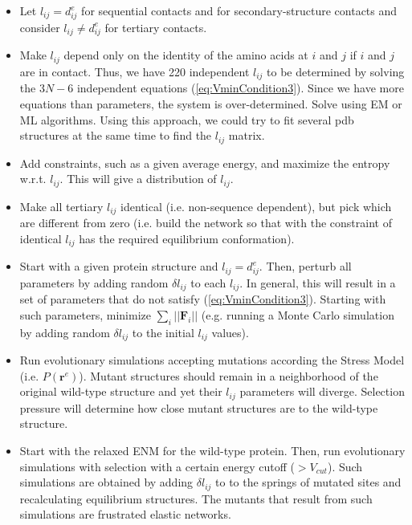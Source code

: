 \documentclass[12pt]{article}
\newcommand{\lij}{l_{ij}}
\newcommand{\dijEq}{d_{ij}^{e}}
\newcommand{\rvectorEq}{\mathbf{r}^{e}}
\begin{document}
\begin{itemize}

\item Let $\lij= \dijEq$ for sequential contacts and for secondary-structure contacts and consider $\lij \neq \dijEq$ for tertiary contacts.

\item Make $\lij$ depend only on the identity of the amino acids at $i$ and $j$ if $i$ and $j$ are in contact. Thus, we have 220 independent $\lij$ to be determined by solving the $3N-6$ independent equations (\ref{eq:VminCondition3}). Since we have more equations than parameters, the system is over-determined. Solve using EM or ML algorithms. Using this approach, we could try to fit several pdb structures at the same time to find the $\lij$ matrix.

\item Add constraints, such as a given average energy, and maximize the entropy w.r.t. $\lij$. This will give a distribution of $\lij$.

\item Make all tertiary $\lij$ identical (i.e. non-sequence dependent), but pick which are different from zero (i.e. build the network so that with the constraint of identical $\lij$ has the required equilibrium conformation).

\item Start with a given protein structure and $\lij = \dijEq$. Then, perturb all parameters by adding random $\delta \lij$ to each $\lij$. In general, this will result in a set of parameters that do not satisfy (\ref{eq:VminCondition3}). Starting with such parameters, minimize $\sum_{i} ||\mathbf{F}_i||$ (e.g. running a Monte Carlo simulation by adding random $\delta \lij$ to the initial $\lij$ values).

\item Run evolutionary simulations accepting mutations according the Stress Model (i.e. $P(\rvectorEq)$). Mutant structures should remain in a neighborhood of the original wild-type structure and yet their $\lij$ parameters will diverge. Selection pressure will determine how close mutant structures are to the wild-type structure.

\item Start with the relaxed ENM for the wild-type protein. Then, run evolutionary simulations with selection with a certain energy cutoff ($> V_{cut}$). Such simulations are obtained by adding $\delta \lij$ to to the springs of mutated sites and recalculating equilibrium structures. The mutants that result from such simulations are frustrated elastic networks.


\end{itemize}
\end{document}
